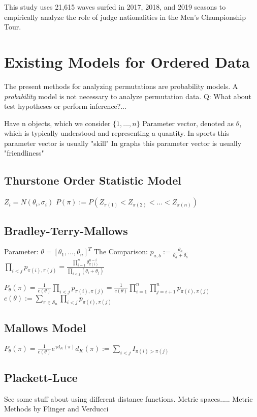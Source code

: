 \documentclass{article}
\theoremstyle{definition}
\begin{document}
This study uses 21,615 waves surfed in 2017, 2018, and 2019 seasons to empirically analyze the role of judge nationalities in the Men's Championship Tour.

\section{Existing Models for Ordered Data}
The present methods for analyzing permutations are probability models. A \textit{probability} model is not necessary to analyze permutation data.
Q: What about test hypotheses or perform inference?...


Have n objects, which we consider $ \{1,\dots,n\}$
Parameter vector, denoted as $\theta$, which is typically understood and representing a quantity. 
In sports this parameter vector is usually "skill"
In graphs this parameter vector is usually "friendliness"

\subsection{Thurstone Order Statistic Model}
$ Z_i = N(\theta_i, \sigma_i) $
\( P(\pi) := P(Z_{\pi(1)} < Z_{\pi(2)} < \dots < Z_{\pi(n)} ) \)

\subsection{Bradley-Terry-Mallows}
Parameter: \(\theta = [\theta_1, \dots, \theta_n]^T\)
The Comparison: \( p_{a,b} := \frac{\theta_a}{\theta_a + \theta_b} \)
\( 
\prod_{i<j} p_{\pi(i),\pi(j)} = \frac{ \prod_{i=1}^n \theta_{\pi(i)}^{n-i} }{ \prod_{i<j}(\theta_i + \theta_j) }
\)

\(
P_\theta(\pi) = \frac{1}{ c(\theta) } \prod_{i<j}p_{\pi(i),\pi(j)} 
= \frac{1}{c(\theta)} \prod_{i=1}^n \prod_{j=i+1}^n p_{\pi(i),\pi(j)}
\)
\(c(\theta) := \sum_{\pi \in \mathcal{S}_n} \prod_{i<j} p_{\pi(i),\pi(j)}
\)

\subsection{Mallows Model}
\(
P_\theta(\pi) = \frac{1}{ c(\theta) }e^{\gamma d_K(\pi)}
d_K(\pi):= \sum_{i<j} I_{\pi(i)>\pi(j)}
\)

\subsection{Plackett-Luce}
See some stuff about using different distance functions. Metric spaces.....
Metric Methods by Flinger and Verducci
\end{document}
